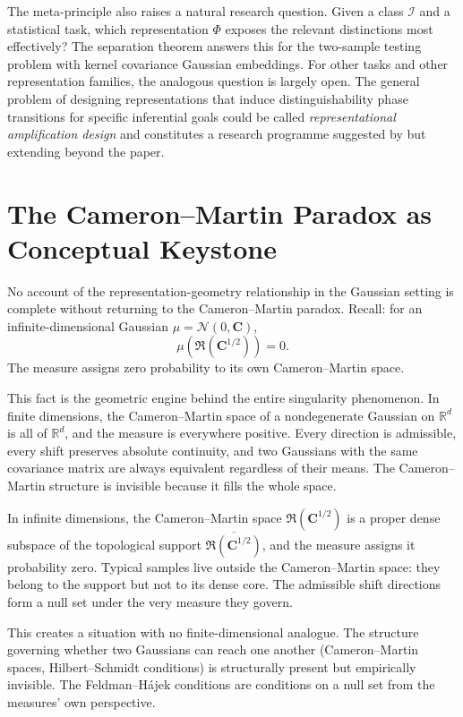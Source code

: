 \documentclass[12pt, oneside]{book}
\theoremstyle{plain}
\theoremstyle{definition}
\newcommand{\R}{\mathbb{R}}
\newcommand{\calN}{\mathcal{N}}
\newcommand{\ran}{\mathfrak{R}}
\newcommand{\calI}{\mathcal{I}}
\begin{document}
The meta-principle also raises a natural research question. Given a class $\calI$ and a statistical task, which representation $\Phi$ exposes the relevant distinctions most effectively? The separation theorem answers this for the two-sample testing problem with kernel covariance Gaussian embeddings. For other tasks and other representation families, the analogous question is largely open. The general problem of designing representations that induce distinguishability phase transitions for specific inferential goals could be called \emph{representational amplification design} and constitutes a research programme suggested by but extending beyond the paper.

\section{The Cameron--Martin Paradox as Conceptual Keystone}

No account of the representation-geometry relationship in the Gaussian setting is complete without returning to the Cameron--Martin paradox. Recall: for an infinite-dimensional Gaussian $\mu = \calN(0, \mathbf{C})$,
\begin{equation}
\mu\!\left(\ran(\mathbf{C}^{1/2})\right) = 0.
\end{equation}
The measure assigns zero probability to its own Cameron--Martin space.

This fact is the geometric engine behind the entire singularity phenomenon. In finite dimensions, the Cameron--Martin space of a nondegenerate Gaussian on $\R^d$ is all of $\R^d$, and the measure is everywhere positive. Every direction is admissible, every shift preserves absolute continuity, and two Gaussians with the same covariance matrix are always equivalent regardless of their means. The Cameron--Martin structure is invisible because it fills the whole space.

In infinite dimensions, the Cameron--Martin space $\ran(\mathbf{C}^{1/2})$ is a proper dense subspace of the topological support $\overline{\ran(\mathbf{C}^{1/2})}$, and the measure assigns it probability zero. Typical samples live outside the Cameron--Martin space: they belong to the support but not to its dense core. The admissible shift directions form a null set under the very measure they govern.

This creates a situation with no finite-dimensional analogue. The structure governing whether two Gaussians can reach one another (Cameron--Martin spaces, Hilbert--Schmidt conditions) is structurally present but empirically invisible. The Feldman--H\'ajek conditions are conditions on a null set from the measures' own perspective.
\end{document}
